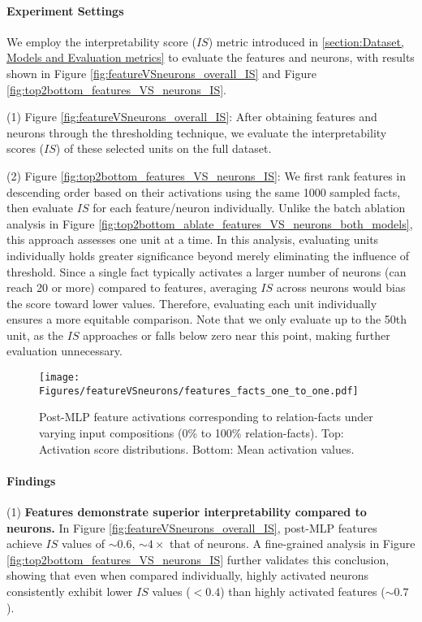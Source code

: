 \paragraph{Experiment Settings}
We employ the interpretability score ($IS$) metric introduced in \textsection\ref{section:Dataset, Models and Evaluation metrics} to evaluate the features and neurons, with results shown in Figure \ref{fig:featureVSneurons_overall_IS} and Figure \ref{fig:top2bottom_features_VS_neurons_IS}.

(1) Figure \ref{fig:featureVSneurons_overall_IS}: After obtaining features and neurons through the thresholding technique, we evaluate the interpretability scores ($IS$) of these selected units on the full dataset.

(2) Figure \ref{fig:top2bottom_features_VS_neurons_IS}: We first rank features in descending order based on their activations using the same 1000 sampled facts, then evaluate $IS$ for each feature/neuron individually. Unlike the batch ablation analysis in Figure \ref{fig:top2bottom_ablate_features_VS_neurons_both_models}, this approach assesses one unit at a time.
In this analysis, evaluating units individually holds greater significance beyond merely eliminating the influence of threshold. Since a single fact typically activates a larger number of neurons (can reach 20 or more) compared to features,  averaging $IS$ across neurons would bias the score toward lower values.  Therefore, evaluating each unit individually ensures a more equitable comparison. Note that we only evaluate up to the 50th unit, as the $IS$ approaches or falls below zero near this point, making further evaluation unnecessary.
\begin{figure*}
    \centering
    \texttt{[image: Figures/featureVSneurons/features\_facts\_one\_to\_one.pdf]}
\caption{Post-MLP feature activations corresponding to relation-facts under varying input compositions (0\% to 100\% relation-facts). Top: Activation score distributions. Bottom: Mean activation values.}
    \label{fig:features_facts_one_to_one}
\end{figure*}
\paragraph{Findings}
(1) \textbf{Features demonstrate superior interpretability compared to neurons.} In Figure \ref{fig:featureVSneurons_overall_IS}, post-MLP features achieve $IS$ values of $\sim0.6$, $\sim4\times$ that of neurons. A fine-grained analysis in Figure \ref{fig:top2bottom_features_VS_neurons_IS} further validates this conclusion, showing that even when compared individually, highly activated neurons consistently exhibit lower $IS$ values ($<0.4$) than highly activated features ($\sim0.7$).

